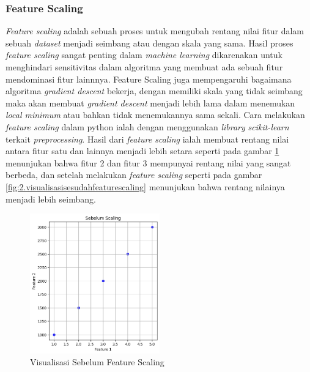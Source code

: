 \subsubsection{Feature Scaling} \label{II.featurescaling}
\textit{Feature scaling} adalah sebuah proses untuk mengubah rentang nilai fitur dalam sebuah \textit{dataset} menjadi seimbang atau dengan skala yang sama\cite{alpaydin2021machine}. Hasil proses \textit{feature scaling} sangat penting dalam \textit{machine learning} dikarenakan untuk menghindari sensitivitas dalam algoritma yang membuat ada sebuah fitur mendominasi fitur lainnnya\cite{dong2018feature}. Feature Scaling juga mempengaruhi bagaimana algoritma \textit{gradient descent} bekerja, dengan memiliki skala yang tidak seimbang maka akan membuat \textit{gradient descent} menjadi lebih lama dalam menemukan \textit{local minimum} atau bahkan tidak menemukannya sama sekali\cite{ruder2016overview}. Cara melakukan \textit{feature scaling} dalam python ialah dengan menggunakan \textit{library} \textit{scikit-learn} terkait \textit{preprocessing}. Hasil dari \textit{feature scaling} ialah membuat rentang nilai antara fitur satu dan lainnya menjadi lebih setara seperti pada gambar \ref{fig:2.visualisasisebelumfeaturescaling} menunjukan bahwa fitur 2 dan fitur 3 mempunyai rentang nilai yang sangat berbeda, dan setelah melakukan \textit{feature scaling} seperti pada gambar \ref{fig:2.visualisasisesudahfeaturescaling} menunjukan bahwa rentang nilainya menjadi lebih seimbang.
\begin{figure}[H] %
    \centering
    \includegraphics[width=0.5\textwidth]{figure/before feature scaling.png}
    \caption{Visualisasi Sebelum Feature Scaling}
    \label{fig:2.visualisasisebelumfeaturescaling}
\end{figure}
